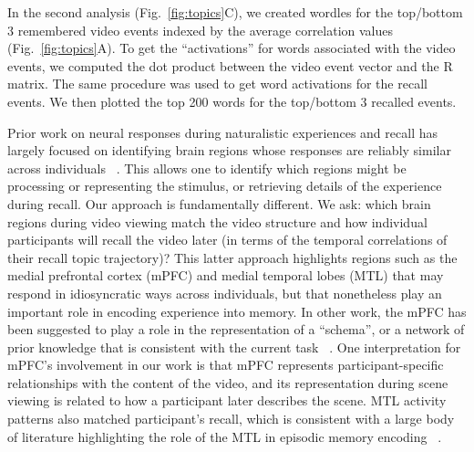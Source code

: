 In the second analysis (Fig.~\ref{fig:topics}C), we created wordles for the top/bottom 3 remembered video events indexed by the average correlation values (Fig.~\ref{fig:topics}A).  To get the ``activations'' for words associated with the video events, we computed the dot product between the video event vector and the R matrix. The same procedure was used to get word activations for the recall events. We then plotted the top 200 words for the top/bottom 3 recalled events.











Prior work on neural responses during naturalistic experiences and recall has largely focused on identifying brain regions whose responses are reliably similar across individuals ~\citep{LernEtal11, SimoEtal16, ChenEtal17, BaldEtal17, ZadbEtal17}. This allows one to identify which regions might be processing or representing the stimulus, or retrieving details of the experience during recall. Our approach is fundamentally different. We ask: which brain regions during video viewing match the video structure and how individual participants will recall the video later (in terms of the temporal correlations of their recall topic trajectory)? This latter approach highlights regions such as the medial prefrontal cortex (mPFC) and medial temporal lobes (MTL) that may respond in idiosyncratic ways across individuals, but that nonetheless play an important role in encoding experience into memory. In other work, the mPFC has been suggested to play a role in the representation of a ``schema'', or a network of prior knowledge that is consistent with the current task ~\citep{KestEtal12, GilbMarl17}. One interpretation for mPFC's involvement in our work is that mPFC represents participant-specific relationships with the content of the video, and its representation during scene viewing is related to how a participant later describes the scene. MTL activity patterns also matched participant's recall, which is consistent with a large body of literature highlighting the role of the MTL in episodic memory encoding ~\citep{PallWagn02, DavaEtAl03, RangEtal04, Dava06}.



